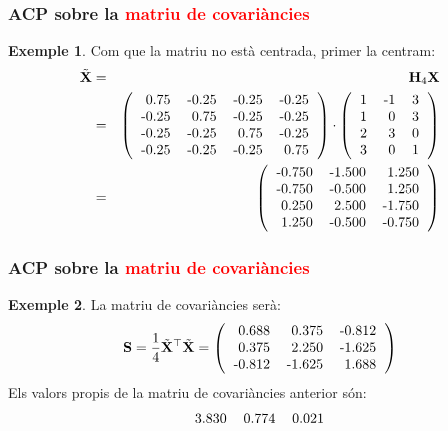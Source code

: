 \documentclass[12pt,t]{beamer}
\newcommand{\red}[1]{\textcolor{red}{#1}}
\theoremstyle{plain}
\theoremstyle{definition}
\newtheorem{exemple}{Exemple}
\begin{document}
\begin{frame}
\frametitle{ACP sobre la \red{matriu de covariàncies}}
\begin{exemple}
Com que la matriu no està centrada, primer la centram:
{\footnotesize
\begin{eqnarray*}
\tilde{\mathbf{X}}& = & \mathbf{H}_4\mathbf{X} \\ &=&
\left(
\begin{tabular}{rrrr}
  0.75 & -0.25 & -0.25 & -0.25 \\ 
  -0.25 & 0.75 & -0.25 & -0.25 \\ 
  -0.25 & -0.25 & 0.75 & -0.25 \\ 
  -0.25 & -0.25 & -0.25 & 0.75 \\ 
  \end{tabular}\right)\cdot
\left(
\begin{tabular}{rrr}
  1 & -1 & 3 \\ 
  1 & 0 & 3 \\ 
  2 & 3 & 0 \\ 
  3 & 0 & 1 \\ 
  \end{tabular}\right) \\ &=&
\left(
\begin{tabular}{rrr}
  -0.750 & -1.500 & 1.250 \\ 
  -0.750 & -0.500 & 1.250 \\ 
  0.250 & 2.500 & -1.750 \\ 
  1.250 & -0.500 & -0.750 \\ 
  \end{tabular}\right)
\end{eqnarray*}
}
\end{exemple}
\end{frame}

\begin{frame}
\frametitle{ACP sobre la \red{matriu de covariàncies}}
\begin{exemple}
{
La matriu de covariàncies serà:
\[
\mathbf{S}=\frac{1}{4}\tilde{\mathbf{X}}^\top\tilde{\mathbf{X}}=
\left(
\begin{tabular}{rrr}
  0.688 & 0.375 & -0.812 \\ 
  0.375 & 2.250 & -1.625 \\ 
  -0.812 & -1.625 & 1.688 \\ 
  \end{tabular}\right)
\]
Els valors propis de la matriu de covariàncies anterior són:
\[
\begin{tabular}{rrr}
  3.830 & 0.774 & 0.021 \\ 
  \end{tabular}\]
}
\end{exemple}
\end{frame}
\end{document}
